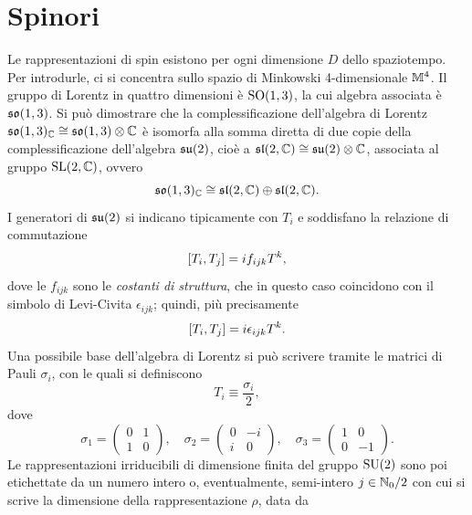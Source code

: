 \chapter{Spinori}
Le rappresentazioni di spin esistono per ogni dimensione $D$ dello spaziotempo. Per introdurle, ci si concentra sullo spazio di Minkowski 4-dimensionale $\mathbb{M}^4$. Il gruppo di Lorentz in quattro dimensioni è $\mathrm{SO}(1,3)$, la cui algebra associata è $\mathfrak{so}(1,3)$. Si può dimostrare che la complessificazione dell'algebra di Lorentz $\mathfrak{so}(1,3)_{\mathbb{C}} \cong \mathfrak{so}(1,3) \otimes \mathbb{C} $ è isomorfa alla somma diretta di due copie della complessificazione dell'algebra $\mathfrak{su}(2)$, cioè a $\mathfrak{sl}(2,\mathbb{C}) \cong \mathfrak{su}(2) \otimes \mathbb{C}$, associata al gruppo $\mathrm{SL}(2,\mathbb{C})$, ovvero 
\begin{equation}
    \mathfrak{so}(1,3)_{\mathbb{C}} \cong \mathfrak{sl}(2,\mathbb{C}) \oplus \mathfrak{sl}(2,\mathbb{C}).
\end{equation}
I generatori di $\mathfrak{su}(2)$ si indicano tipicamente con $T_i$ e soddisfano la relazione di commutazione 
\begin{equation}
    [T_i,T_j] = if_{ijk}T^k,
\end{equation}
dove le $f_{ijk}$ sono le \emph{costanti di struttura}, che in questo caso coincidono con il simbolo di Levi-Civita $\epsilon_{ijk}$; quindi, più precisamente
\begin{equation}
    [T_i,T_j] = i\epsilon_{ijk}T^k.
\end{equation}
Una possibile base dell'algebra di Lorentz si può scrivere tramite le matrici di Pauli $\sigma_i$, con le quali si definiscono 
\begin{equation}
    T_i \equiv \frac{\sigma_i}{2},
\end{equation}
dove 
\begin{equation}
    \sigma_1 = 
    \begin{pmatrix}
        0 & 1 \\
        1 & 0
    \end{pmatrix},\quad
    \sigma_2 = 
    \begin{pmatrix}
        0 & -i \\
        i & 0
    \end{pmatrix},\quad
    \sigma_3 = 
    \begin{pmatrix}
        1 & 0 \\
        0 & -1
    \end{pmatrix}.
\end{equation}
Le rappresentazioni irriducibili di dimensione finita del gruppo $\mathrm{SU}(2)$ sono poi etichettate da un numero intero o, eventualmente, semi-intero $j \in \mathbb{N}_0/2$ con cui si scrive la dimensione della rappresentazione $\rho$, data da
